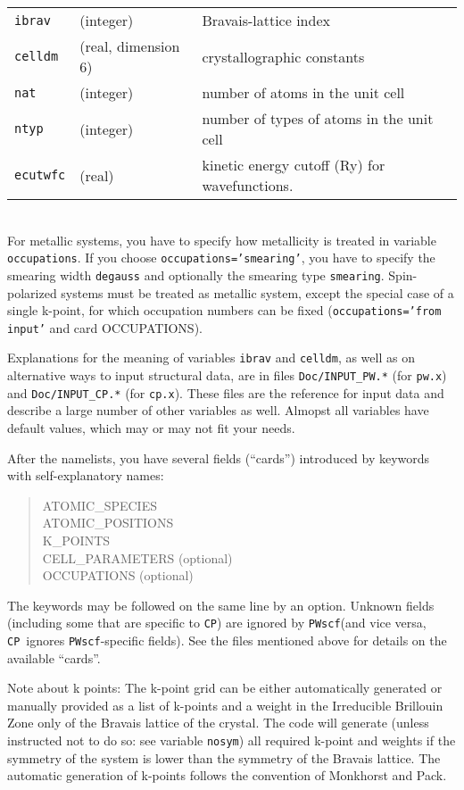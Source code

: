 \documentclass[12pt,a4paper]{article}
\def\pw.x{\texttt{pw.x}}
\def\cp.x{\texttt{cp.x}}
\def\PWscf{\texttt{PWscf}}
\def\CP{\texttt{CP}}
\begin{document}
\begin{tabular}{lll}
      \texttt{ibrav} & (integer)& Bravais-lattice index\\
      \texttt{celldm} &(real, dimension 6)& crystallographic constants\\
      \texttt{nat} &(integer)& number of atoms in the unit cell\\
      \texttt{ntyp} &(integer)& number of types of atoms in the unit cell\\
      \texttt{ecutwfc} &(real)& kinetic energy cutoff (Ry) for wavefunctions.
\end{tabular}    \\
For metallic systems, you have to specify how metallicity is treated
in
variable \texttt{occupations}. If you choose \texttt{occupations='smearing'},
you have
to specify the smearing width \texttt{degauss} and optionally the smearing
type
\texttt{smearing}. Spin-polarized systems must be treated as metallic system, except the 
special case of a single k-point, for which occupation numbers can be fixed
(\texttt{occupations='from input'} and card OCCUPATIONS).
    
Explanations for the meaning of variables \texttt{ibrav} and \texttt{celldm},
as well as on alternative ways to input structural data,
are in files \texttt{Doc/INPUT\_PW.*} (for \pw.x) and \texttt{Doc/INPUT\_CP.*}
(for \cp.x). These files are the reference for input data and describe 
a large number of other variables as well. Almopst all variables have default 
values, which may or may not fit your needs.
    
After the namelists, you have several fields (``cards'')
introduced by keywords with self-explanatory names:
\begin{quote}
       ATOMIC\_SPECIES\\
       ATOMIC\_POSITIONS\\
       K\_POINTS\\
       CELL\_PARAMETERS (optional)\\
       OCCUPATIONS (optional)\\
\end{quote}
The keywords may be followed on the same line by an option. Unknown
fields (including some that are specific to \CP) are ignored by 
\PWscf (and vice versa, \CP\ ignores \PWscf-specific fields).
See the files mentioned above for details on the available ``cards''.
 
Note about k points: The k-point grid can be either automatically generated 
or manually provided as a list of k-points and a weight in the Irreducible
Brillouin Zone only of the Bravais lattice of the crystal. The code will 
generate (unless instructed not to do so: see variable \texttt{nosym}) all
required k-point 
and weights if the symmetry of the system is lower than the symmetry of the
Bravais lattice. The automatic generation of k-points follows the convention
of Monkhorst and Pack.
\end{document}
